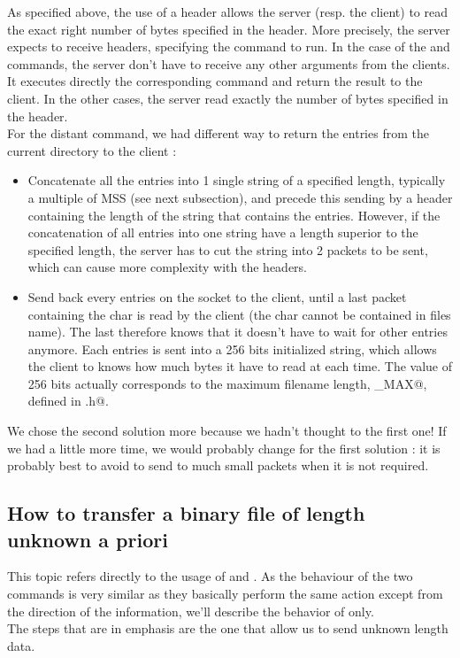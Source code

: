 \documentclass{article}
\begin{document}
As specified above, the use of a header allows the server (resp. the client) to read the exact right number of bytes specified in the header. More precisely, the server expects to receive headers, specifying the command to run. In the case of the \verb@PWD@ and \verb@LS@ commands, the server don't have to receive any other arguments from the clients. It executes directly the corresponding command and return the result to the client. In the other cases, the server read exactly the number of bytes specified in the header.\\

For the distant \verb@LS@ command, we had different way to return the entries from the current directory to the client : 
\begin{itemize}
\item Concatenate all the entries into 1 single string of a specified length, typically a multiple of MSS (see next subsection), and precede this sending by a header containing the length of the string that contains the entries. However, if the concatenation of all entries into one string have a length superior to the specified length, the server has to cut the string into 2 packets to be sent, which can cause more complexity with the headers.
\item Send back every entries on the socket to the client, until a last packet containing the char \verb@\n@ is read by the client (the char \verb@\n@ cannot be contained in files name). The last therefore knows that it doesn't have to wait for other entries anymore. Each entries is sent into a 256 bits initialized string, which allows the client to knows how much bytes it have to read at each time. The value of 256 bits actually corresponds to the maximum filename length, \verb@NAME_MAX@, defined in \verb@limits.h@.
\end{itemize}

We chose the second solution more because we hadn't thought to the first one! If we had a little more time, we would probably change for the first solution : it is probably best to avoid to send to much small packets when it is not required.

\subsection{How to transfer a binary file of length unknown a priori}
This topic refers directly to the usage of \verb@GET@ and \verb@PUT@. As the behaviour of the two commands is very similar as they basically perform the same action except from the direction of the information, we'll describe the behavior of \verb@PUT@ only. \\
The steps that are in emphasis are the one that allow us to send unknown length data.\\
\end{document}
